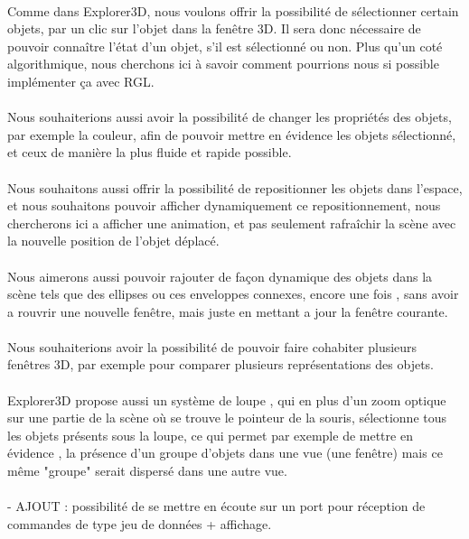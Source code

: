 \paragraph{}
Comme dans Explorer3D, nous voulons offrir la possibilité de sélectionner certain objets, par un clic sur l’objet dans la fenêtre 3D. Il sera donc nécessaire
de pouvoir connaître l’état d’un objet, s’il est sélectionné ou non. Plus qu’un coté algorithmique, nous cherchons ici à savoir comment pourrions nous si
possible implémenter ça avec RGL.

\paragraph{}
Nous souhaiterions aussi avoir la possibilité de changer les propriétés des objets, par exemple la couleur, afin de pouvoir mettre en évidence les objets sélectionné, et ceux de manière la plus fluide et rapide possible.

\paragraph{}
Nous souhaitons aussi offrir la possibilité de repositionner les objets dans l'espace, et nous souhaitons pouvoir afficher dynamiquement ce repositionnement, nous chercherons ici a afficher une animation, et pas seulement rafraîchir la scène avec la nouvelle position de l'objet déplacé. 

\paragraph{}
Nous aimerons aussi pouvoir rajouter de façon dynamique des objets dans la scène tels que des ellipses ou ces enveloppes connexes, encore une fois , sans avoir a rouvrir une nouvelle fenêtre, mais juste en mettant a jour la fenêtre courante.

\paragraph{}
Nous souhaiterions avoir la possibilité de pouvoir faire cohabiter plusieurs fenêtres 3D,  par exemple pour comparer plusieurs représentations des objets.

\paragraph{}
Explorer3D propose aussi un système de loupe , qui en plus d'un zoom optique sur une partie de la scène où se trouve le pointeur de la souris, sélectionne tous les objets présents sous la loupe, ce qui permet par exemple de mettre en évidence , la présence d'un groupe d'objets dans une vue (une fenêtre) mais ce même "groupe" serait dispersé dans une autre vue.

\paragraph{}
- AJOUT : possibilité de se mettre en écoute sur un port pour réception de commandes de type jeu de données + affichage.

\newpage